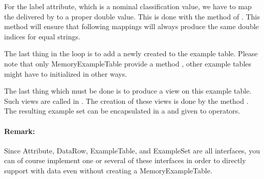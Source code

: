 For the label attribute, which is a nominal classification value, we have to map the 
delivered by  to a proper double value. This is done with the method
 of . This method will ensure that following mappings 
will always produce the same double indices for equal strings.

The last thing in the loop is to add a newly created  to the example table. 
Please note that only MemoryExampleTable provide a method , other
example tables might have to initialized in other ways.


The last thing which must be done is to produce a view on this example table. Such views are called
 in \rapidminer. The creation of these views is done by the method 
. The resulting example set
can be encapsulated in a  and given to operators.

\paragraph{Remark:}
Since Attribute, DataRow, ExampleTable, and ExampleSet are all interfaces, you can of course implement
one or several of these interfaces in order to directly support \rapidminer with data even without
creating a MemoryExampleTable.

